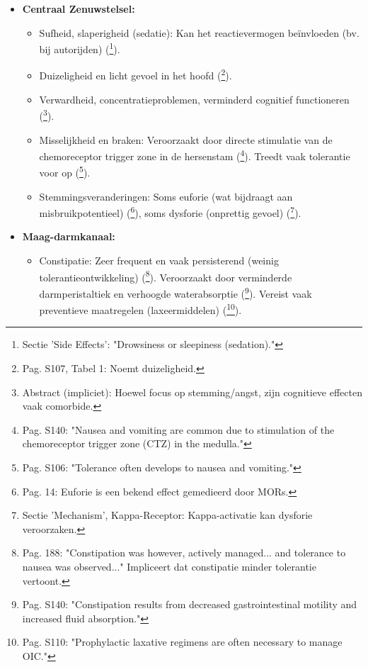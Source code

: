 \documentclass[11pt, a4paper]{report} %
\begin{document}
\begin{itemize}
    \item \textbf{Centraal Zenuwstelsel:}
        \begin{itemize}
            \item Sufheid, slaperigheid (sedatie): Kan het reactievermogen beïnvloeden (bv. bij autorijden) (\cite{ClevelandClinicOpioids}\footnote{Sectie 'Side Effects': "Drowsiness or sleepiness (sedation)."}).
            \item Duizeligheid en licht gevoel in het hoofd (\cite{Benyamin2008OpioidComplications}\footnote{Pag. S107, Tabel 1: Noemt duizeligheid.}).
            \item Verwardheid, concentratieproblemen, verminderd cognitief functioneren (\cite{Dale2022MoodAnxiety}\footnote{Abstract (impliciet): Hoewel focus op stemming/angst, zijn cognitieve effecten vaak comorbide.}).
            \item Misselijkheid en braken: Veroorzaakt door directe stimulatie van de chemoreceptor trigger zone in de hersenstam (\cite{Trescot2008OpioidPharm}\footnote{Pag. S140: "Nausea and vomiting are common due to stimulation of the chemoreceptor trigger zone (CTZ) in the medulla."}). Treedt vaak tolerantie voor op (\cite{Benyamin2008OpioidComplications}\footnote{Pag. S106: "Tolerance often develops to nausea and vomiting."}).
            \item Stemmingsveranderingen: Soms euforie (wat bijdraagt aan misbruikpotentieel) (\cite{Kosten2002NeurobiologyDependence}\footnote{Pag. 14: Euforie is een bekend effect gemedieerd door MORs.}), soms dysforie (onprettig gevoel) (\cite{StatPearlsOpioidReceptor}\footnote{Sectie 'Mechanism', Kappa-Receptor: Kappa-activatie kan dysforie veroorzaken.}).
        \end{itemize}
    \item \textbf{Maag-darmkanaal:}
        \begin{itemize}
            \item Constipatie: Zeer frequent en vaak persisterend (weinig tolerantieontwikkeling) (\cite{Riley2008OxycodoneReview}\footnote{Pag. 188: "Constipation was however, actively managed... and tolerance to nausea was observed..." Impliceert dat constipatie minder tolerantie vertoont.}). Veroorzaakt door verminderde darmperistaltiek en verhoogde waterabsorptie (\cite{Trescot2008OpioidPharm}\footnote{Pag. S140: "Constipation results from decreased gastrointestinal motility and increased fluid absorption."}). Vereist vaak preventieve maatregelen (laxeermiddelen) (\cite{Benyamin2008OpioidComplications}\footnote{Pag. S110: "Prophylactic laxative regimens are often necessary to manage OIC."}).

\end{itemize}
\end{itemize}
\end{document}
